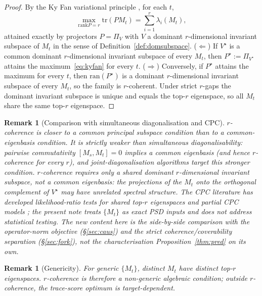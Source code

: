 \documentclass[final,3p,times]{elsarticle}
\newtheorem{remark}[theorem]{Remark}
\newcommand{\tr}{\mathrm{tr}}
\newcommand{\rank}{\mathrm{rank}}
\newcommand{\ran}{\mathrm{ran}}
\begin{document}
\begin{proof}
By the Ky Fan variational principle \cite{Fan1949,HornJohnson2013}, for
each $t$,
\begin{equation}\label{eq:kyfan}
\max_{\rank P = r} \tr(P M_t) = \sum_{i=1}^r \lambda_i(M_t),
\end{equation}
attained exactly by projectors $P=\Pi_V$ with $V$ a dominant
$r$-dimensional invariant subspace of $M_t$ in the sense of
Definition~\ref{def:domsubspace}.
($\Leftarrow$) If $V^\star$ is a common dominant $r$-dimensional invariant
subspace of every $M_t$, then $P^\star:=\Pi_{V^\star}$ attains the
maximum~\eqref{eq:kyfan} for every $t$.
($\Rightarrow$) Conversely, if $P^\star$ attains the maximum for every
$t$, then $\ran(P^\star)$ is a dominant $r$-dimensional invariant
subspace of every $M_t$, so the family is $r$-coherent.
Under strict $r$-gaps the dominant invariant subspace is unique and equals
the top-$r$ eigenspace, so all $M_t$ share the same top-$r$ eigenspace.
\end{proof}

\begin{remark}[Comparison with simultaneous diagonalisation and CPC]
$r$-coherence is closer to a \emph{common principal subspace} condition
\cite{Flury1984,Krzanowski1979,Schott1991,Boik2002} than to a
common-eigenbasis condition.
It is strictly weaker than simultaneous diagonalisability: pairwise
commutativity $[M_s,M_t]=0$ implies a common eigenbasis (and hence
$r$-coherence for every $r$), and joint-diagonalisation algorithms
\cite{Pham2001} target this stronger condition.
$r$-coherence requires only a shared dominant $r$-dimensional invariant
subspace, not a common eigenbasis: the projections of the $M_t$ onto
the orthogonal complement of $V^\star$ may have unrelated spectral
structure.
The CPC literature has developed likelihood-ratio tests for shared
top-$r$ eigenspaces and partial CPC models
\cite{Schott1991,Boik2002}; the present note treats $\{M_t\}$ as exact
PSD inputs and does not address statistical testing.
The new content here is the side-by-side comparison with the
operator-norm objective (\S\ref{sec:caus}) and the strict
coherence/coverability separation (\S\ref{sec:fork}), not the
characterisation Proposition~\ref{thm:pred} on its own.
\end{remark}

\begin{remark}[Genericity]
For generic $\{M_t\}$, distinct $M_t$ have distinct top-$r$ eigenspaces.
$r$-coherence is therefore a non-generic algebraic condition; outside
$r$-coherence, the trace-score optimum is target-dependent.
\end{remark}
\end{document}
